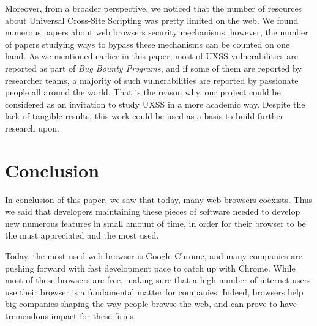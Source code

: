 \documentclass[journal]{IEEEtran}
\begin{document}
\medskip

Moreover, from a broader perspective, we noticed that the number of resources about Universal Cross-Site Scripting was pretty limited on the web. We found numerous papers about web browsers security mechanisms, however, the number of papers studying ways to bypass these mechanisms can be counted on one hand. As we mentioned earlier in this paper, most of UXSS vulnerabilities are reported as part of \emph{Bug Bounty Programs}, and if some of them are reported by researcher teams, a majority of such vulnerabilities are reported by passionate people all around the world. That is the reason why, our project could be considered as an invitation to study UXSS in a more academic way. Despite the lack of tangible results, this work could be used as a basis to build further research upon.


\section{Conclusion}

In conclusion of this paper, we saw that today, many web browsers coexists. Thus we said that developers maintaining these pieces of software needed to develop new numerous features in small amount of time, in order for their browser to be the must appreciated and the most used. 

\medskip

Today, the most used web browser is Google Chrome, and many companies are pushing forward with fast development pace to catch up with Chrome. While most of these browsers are free, making sure that a high number of internet users use their browser is a fundamental matter for companies. Indeed, browsers help big companies shaping the way people browse the web, and can prove to have tremendous impact for these firms.

\medskip
\end{document}
